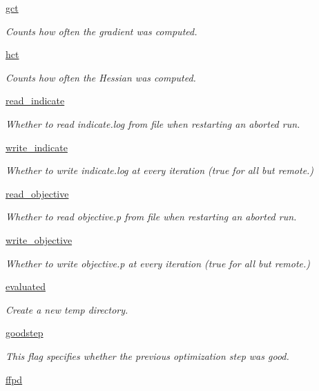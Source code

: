 \begin{DoxyCompactItemize}
\hyperlink{classsrc_1_1target_1_1Target_a12d4d43cc0344c23e687941c6df7c1c7}{gct}
\begin{DoxyCompactList}\small\item\em Counts how often the gradient was computed. \end{DoxyCompactList}\item 
\hyperlink{classsrc_1_1target_1_1Target_a7964ee4d0c5d7c249b50aa97bcafc73e}{hct}
\begin{DoxyCompactList}\small\item\em Counts how often the Hessian was computed. \end{DoxyCompactList}\item 
\hyperlink{classsrc_1_1target_1_1Target_a5c854d5d857ed68e887808fb86011906}{read\+\_\+indicate}
\begin{DoxyCompactList}\small\item\em Whether to read indicate.\+log from file when restarting an aborted run. \end{DoxyCompactList}\item 
\hyperlink{classsrc_1_1target_1_1Target_a5ff3607a8c506a55391373efeb7e96e6}{write\+\_\+indicate}
\begin{DoxyCompactList}\small\item\em Whether to write indicate.\+log at every iteration (true for all but remote.) \end{DoxyCompactList}\item 
\hyperlink{classsrc_1_1target_1_1Target_a0d3f766725247a90dc1b4ab8ec89e1c9}{read\+\_\+objective}
\begin{DoxyCompactList}\small\item\em Whether to read objective.\+p from file when restarting an aborted run. \end{DoxyCompactList}\item 
\hyperlink{classsrc_1_1target_1_1Target_ac1a22fe6151b536329f6cfb3a9e4b7ee}{write\+\_\+objective}
\begin{DoxyCompactList}\small\item\em Whether to write objective.\+p at every iteration (true for all but remote.) \end{DoxyCompactList}\item 
\hyperlink{classsrc_1_1target_1_1Target_a49df3701811acb53bcabb298a101ac2b}{evaluated}
\begin{DoxyCompactList}\small\item\em Create a new temp directory. \end{DoxyCompactList}\item 
\hyperlink{classsrc_1_1target_1_1Target_a60944e53d96d66201273a52027896abb}{goodstep}
\begin{DoxyCompactList}\small\item\em This flag specifies whether the previous optimization step was good. \end{DoxyCompactList}\item 
\hyperlink{classsrc_1_1target_1_1Target_a48209401694b7ab1cd207f9f214caa7a}{ffpd}
\end{DoxyCompactItemize}


